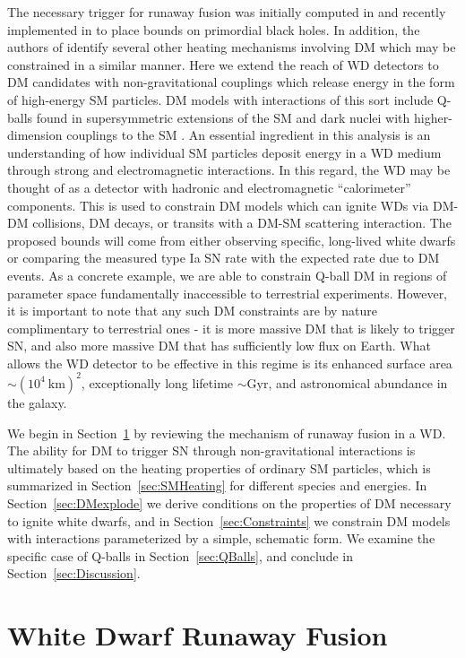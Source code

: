 \documentclass[twocolumn,preprintnumbers,amsmath,amssymb,prl, superscriptaddress]{revtex4}
\begin{document}
The necessary trigger for runaway fusion was initially computed in \cite{Woosley} and recently implemented in \cite{Graham:2015apa} to place bounds on primordial black holes.
In addition, the authors of \cite{Graham:2015apa} identify several other heating mechanisms involving DM which may be constrained in a similar manner.
Here we extend the reach of WD detectors to DM candidates with non-gravitational couplings which release energy in the form of high-energy SM particles.
DM models with interactions of this sort include Q-balls found in supersymmetric extensions of the SM and dark nuclei with higher-dimension couplings to the SM \cite{Hardy:2014mqa}.
An essential ingredient in this analysis is an understanding of how individual SM particles deposit energy in a WD medium through strong and electromagnetic interactions.
In this regard, the WD may be thought of as a detector with hadronic and electromagnetic ``calorimeter'' components.
This is used to constrain DM models which can ignite WDs via DM-DM collisions, DM decays, or transits with a DM-SM scattering interaction.
The proposed bounds will come from either observing specific, long-lived white dwarfs or comparing the measured type Ia SN rate with the expected rate due to DM events.
As a concrete example, we are able to constrain Q-ball DM in regions of parameter space fundamentally inaccessible to terrestrial experiments.
However, it is important to note that any such DM constraints are by nature complimentary to terrestrial ones - it is more massive DM that is likely to trigger SN, and also more massive DM that has sufficiently low flux on Earth.
What allows the WD detector to be effective in this regime is its enhanced surface area $\sim (10^4 ~\text{km})^2$, exceptionally long lifetime $\sim \text{Gyr}$, and astronomical abundance in the galaxy.

We begin in Section~\ref{sec:Review} by reviewing the mechanism of runaway fusion in a WD.
The ability for DM to trigger SN through non-gravitational interactions is ultimately based on the heating properties of ordinary SM particles, which is summarized in Section~\ref{sec:SMHeating} for different species and energies.
In Section~\ref{sec:DMexplode} we derive conditions on the properties of DM necessary to ignite white dwarfs, and in Section~\ref{sec:Constraints} we constrain DM models with interactions parameterized by a simple, schematic form.
We examine the specific case of Q-balls in Section~\ref{sec:QBalls}, and conclude in Section~\ref{sec:Discussion}.

\section{White Dwarf Runaway Fusion}
\label{sec:Review}
\end{document}
